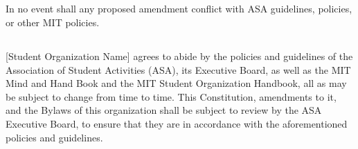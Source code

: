 \documentclass{bylaws}
\begin{document}
\subsection{}In no event shall any proposed amendment conflict with ASA guidelines, policies, or other MIT policies.
\subsection{}[Student Organization Name] agrees to abide by the policies and guidelines of the Association of Student Activities (ASA), its Executive Board,
as well as the MIT Mind and Hand Book and the MIT Student Organization Handbook, all as may be subject to change from time to time. This
Constitution, amendments to it, and the Bylaws of this organization shall be subject to review by the ASA Executive Board, to ensure that they
are in accordance with the aforementioned policies and guidelines.
\end{document}
